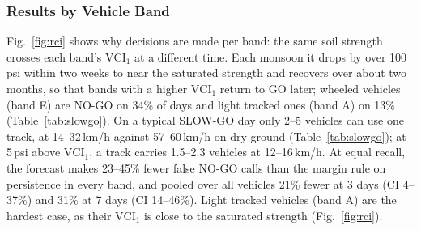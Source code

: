 \documentclass[conference]{IEEEtran}
\begin{document}
\subsubsection{Results by Vehicle Band}
Fig.~\ref{fig:rci} shows why decisions are made per band: the same soil strength crosses each
band's $\mathrm{VCI}_1$ at a different time. Each monsoon it drops by over 100\,psi within two
weeks to near the saturated strength and recovers over about two months, so that bands with a
higher $\mathrm{VCI}_1$ return to GO later; wheeled vehicles (band E) are NO-GO on 34\% of days
and light tracked ones (band A) on 13\% (Table~\ref{tab:slowgo}). On a typical SLOW-GO day only 2--5 vehicles can use one track, at 14--32\,km/h against
57--60\,km/h on dry ground (Table~\ref{tab:slowgo}); at 5\,psi above $\mathrm{VCI}_1$, a track
carries 1.5--2.3 vehicles at 12--16\,km/h. At equal recall, the forecast makes 23--45\% fewer
false NO-GO calls than the margin rule on persistence in every band, and pooled over all vehicles
21\% fewer at 3 days (CI 4--37\%) and 31\% at 7 days (CI 14--46\%). Light tracked vehicles
(band A) are the hardest case, as their $\mathrm{VCI}_1$ is close to the saturated strength (Fig.~\ref{fig:rci}).
\end{document}
